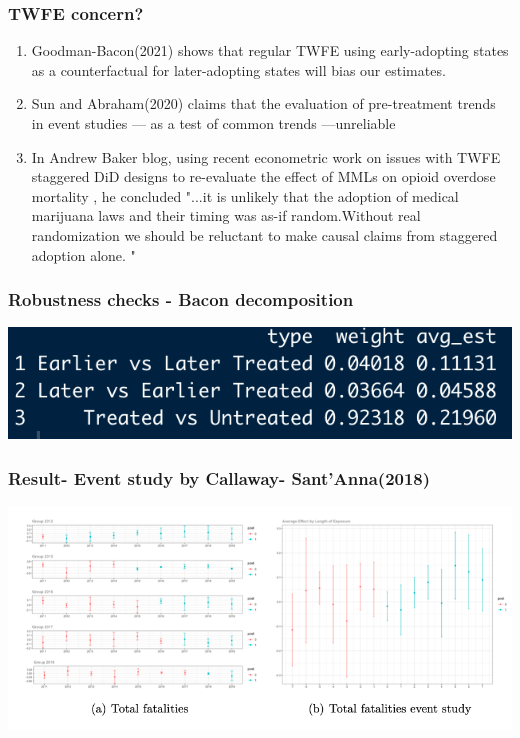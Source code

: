 \documentclass{beamer}
\begin{document}
\begin{frame}
\frametitle{TWFE concern?}
	\begin{enumerate}
		\item
	Goodman-Bacon(2021) shows that regular TWFE using early-adopting states as a counterfactual for later-adopting states will bias our estimates. \\ 
		\item
	Sun and Abraham(2020) claims that the evaluation of pre-treatment trends in event studies — as a test of common trends —unreliable  \\  
		\item
	In Andrew Baker blog, using recent econometric work on issues with TWFE staggered DiD designs to re-evaluate the effect of MMLs on opioid overdose mortality , he concluded "\alert{...it is unlikely that the adoption of medical marijuana laws and their timing was as-if random.Without real randomization we should be reluctant to make causal claims from staggered adoption alone.} " 
	\end{enumerate}
\end{frame}

\begin{frame} %
\frametitle{Robustness checks - Bacon decomposition}
	
	\includegraphics[scale = 0.5]{bacon}
	
\end{frame}

\begin{frame} %
\frametitle{Result- Event study by Callaway- Sant'Anna(2018)}
	
	\includegraphics[scale = 0.33]{event3}
	
\end{frame}
\end{document}

